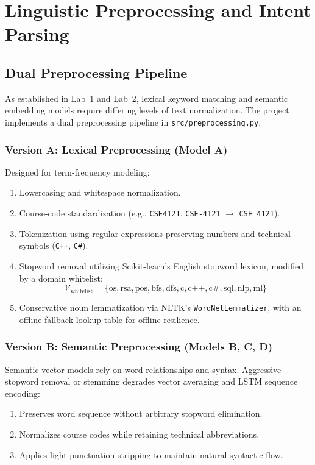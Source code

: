 \documentclass[12pt,a4paper]{report}
\begin{document}
\chapter{Linguistic Preprocessing and Intent Parsing}

\section{Dual Preprocessing Pipeline}
As established in Lab~1 and Lab~2, lexical keyword matching and semantic embedding models require differing levels of text normalization. The project implements a dual preprocessing pipeline in \texttt{src/preprocessing.py}.

\subsection{Version A: Lexical Preprocessing (Model A)}
Designed for term-frequency modeling:
\begin{enumerate}
    \item Lowercasing and whitespace normalization.
    \item Course-code standardization (e.g., \texttt{CSE4121}, \texttt{CSE-4121} $\rightarrow$ \texttt{CSE 4121}).
    \item Tokenization using regular expressions preserving numbers and technical symbols (\texttt{C++}, \texttt{C\#}).
    \item Stopword removal utilizing Scikit-learn's English stopword lexicon, modified by a domain whitelist:
    \begin{equation}
        \mathcal{V}_{\text{whitelist}} = \{\text{os}, \text{rsa}, \text{pos}, \text{bfs}, \text{dfs}, \text{c}, \text{c++}, \text{c\#}, \text{sql}, \text{nlp}, \text{ml}\}
    \end{equation}
    \item Conservative noun lemmatization via NLTK's \texttt{WordNetLemmatizer}, with an offline fallback lookup table for offline resilience.
\end{enumerate}

\subsection{Version B: Semantic Preprocessing (Models B, C, D)}
Semantic vector models rely on word relationships and syntax. Aggressive stopword removal or stemming degrades vector averaging and LSTM sequence encoding:
\begin{enumerate}
    \item Preserves word sequence without arbitrary stopword elimination.
    \item Normalizes course codes while retaining technical abbreviations.
    \item Applies light punctuation stripping to maintain natural syntactic flow.
\end{enumerate}
\end{document}

